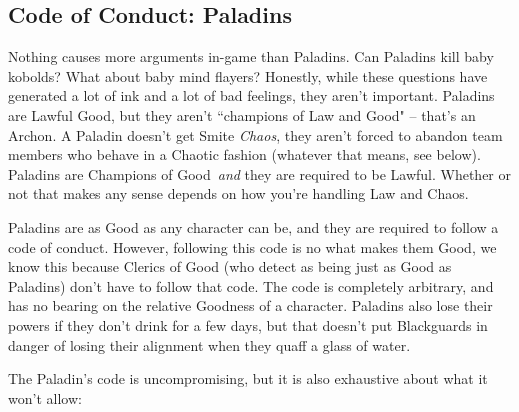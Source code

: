 \subsection{Code of Conduct: Paladins}
Nothing causes more arguments in-game than Paladins. Can Paladins kill baby kobolds? What about baby mind flayers? Honestly, while these questions have generated a lot of ink and a lot of bad feelings, they aren't important. Paladins are Lawful Good, but they aren't ``champions of Law and Good" -- that's an Archon. A Paladin doesn't get Smite \textit{Chaos}, they aren't forced to abandon team members who behave in a Chaotic fashion (whatever that means, see below). Paladins are Champions of Good\texttrademark\ \textit{and} they are required to be Lawful. Whether or not that makes any sense depends on how you're handling Law and Chaos.

Paladins are as Good as any character can be, and they are required to follow a code of conduct. However, following this code is no what makes them Good, we know this because Clerics of Good (who detect as being just as Good as Paladins) don't have to follow that code. The code is completely arbitrary, and has no bearing on the relative Goodness of a character. Paladins also lose their powers if they don't drink for a few days, but that doesn't put Blackguards in danger of losing their alignment when they quaff a glass of water.

The Paladin's code is uncompromising, but it is also exhaustive about what it won't allow:

